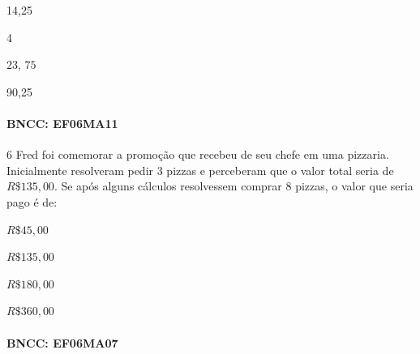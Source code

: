 {\begin{escolha}
\item14,25
\item4
\item $23$, $75$
\item90,25
\end{escolha}

\paragraph{BNCC: EF06MA11 }


\num{6}  Fred foi comemorar a promoção que recebeu de seu chefe em uma
pizzaria. Inicialmente resolveram pedir $3$ pizzas e perceberam que o
valor total seria de $R\$135,00$. Se após alguns cálculos resolvessem
comprar $8$ pizzas, o valor que seria pago é de:

\begin{escolha}
\item $R\$45,00$
\item $R\$135,00$
\item $R\$180,00$
\item $R\$360,00$
\end{escolha}

\paragraph{BNCC: EF06MA07 }


}

